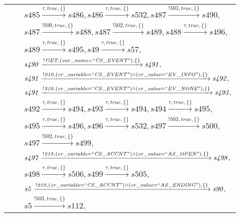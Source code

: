 \begin{tabular}{lcp{350px}}
& & $\mathit{s485}\xrightarrow{\mathit{\tau}, \mathit{true}, \{\}}\mathit{s486},\mathit{s486}\xrightarrow{\mathit{\tau}, \mathit{true}, \{\}}\mathit{s532},\mathit{s487}\xrightarrow{\mathit{!503}, \mathit{true}, \{\}}\mathit{s490},$ \\
& & $\mathit{s487}\xrightarrow{\mathit{!500}, \mathit{true}, \{\}}\mathit{s488},\mathit{s487}\xrightarrow{\mathit{!502}, \mathit{true}, \{\}}\mathit{s489},\mathit{s488}\xrightarrow{\mathit{\tau}, \mathit{true}, \{\}}\mathit{s496},$ \\
& & $\mathit{s489}\xrightarrow{\mathit{\tau}, \mathit{true}, \{\}}\mathit{s495},\mathit{s49}\xrightarrow{\mathit{\tau}, \mathit{true}, \{\}}\mathit{s57},$ \\
& & $\mathit{s490}\xrightarrow{\mathit{?GET}, \mathit{(var\_name = ``CS\_EVENT")}, \{\}}\mathit{s491},$ \\
& & $\mathit{s491}\xrightarrow{\mathit{!210}, \mathit{(cr\_variable = ``CS\_EVENT") \land (cr\_value = ``EV\_INFO")}, \{\}}\mathit{s492},$ \\
& & $\mathit{s491}\xrightarrow{\mathit{!210}, \mathit{(cr\_variable = ``CS\_EVENT") \land (cr\_value = ``EV\_NONE")}, \{\}}\mathit{s493},$ \\
& & $\mathit{s492}\xrightarrow{\mathit{\tau}, \mathit{true}, \{\}}\mathit{s494},\mathit{s493}\xrightarrow{\mathit{\tau}, \mathit{true}, \{\}}\mathit{s494},\mathit{s494}\xrightarrow{\mathit{\tau}, \mathit{true}, \{\}}\mathit{s495},$ \\
& & $\mathit{s495}\xrightarrow{\mathit{\tau}, \mathit{true}, \{\}}\mathit{s496},\mathit{s496}\xrightarrow{\mathit{\tau}, \mathit{true}, \{\}}\mathit{s532},\mathit{s497}\xrightarrow{\mathit{!503}, \mathit{true}, \{\}}\mathit{s500},$ \\
& & $\mathit{s497}\xrightarrow{\mathit{!502}, \mathit{true}, \{\}}\mathit{s499},$ \\
& & $\mathit{s497}\xrightarrow{\mathit{!210}, \mathit{(cr\_variable = ``CS\_ACCNT") \land (cr\_value = ``AS\_OPEN")}, \{\}}\mathit{s498},$ \\
& & $\mathit{s498}\xrightarrow{\mathit{\tau}, \mathit{true}, \{\}}\mathit{s506},\mathit{s499}\xrightarrow{\mathit{\tau}, \mathit{true}, \{\}}\mathit{s505},$ \\
& & $\mathit{s5}\xrightarrow{\mathit{!210}, \mathit{(cr\_variable = ``CS\_ACCNT") \land (cr\_value = ``AS\_ENDING")}, \{\}}\mathit{s90},$ \\
& & $\mathit{s5}\xrightarrow{\mathit{!503}, \mathit{true}, \{\}}\mathit{s112},$ \\

\end{tabular}
